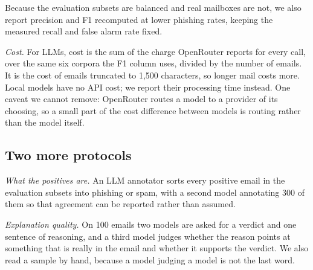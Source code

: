 Because the evaluation subsets are balanced and real mailboxes are not, we also
report precision and F1 recomputed at lower phishing rates, keeping the
measured recall and false alarm rate fixed.

\textit{Cost.} For LLMs, cost is the sum of the charge OpenRouter reports for
every call, over the same six corpora the F1 column uses, divided by the number
of emails. It is the cost of emails truncated to 1{,}500 characters, so longer
mail costs more. Local models have no API cost; we report their processing time
instead. One caveat we cannot remove: OpenRouter routes a model to a provider of
its choosing, so a small part of the cost difference between models is routing
rather than the model itself.

\subsection{Two more protocols}

\textit{What the positives are.} An LLM annotator sorts every positive email in
the evaluation subsets into phishing or spam, with a second model annotating
300 of them so that agreement can be reported rather than assumed.

\textit{Explanation quality.} On 100 emails two models are asked for a verdict
and one sentence of reasoning, and a third model judges whether the reason
points at something that is really in the email and whether it supports the
verdict. We also read a sample by hand, because a model judging a model is not
the last word.
